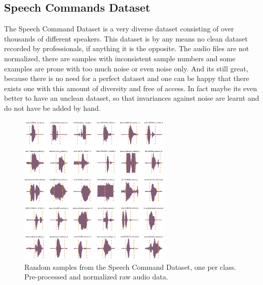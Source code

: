 
\subsection{Speech Commands Dataset}
The Speech Command Dataset \cite{warden2018} is a very diverse dataset consisting of over thousands of different speakers. This dataset is by any means no clean dataset recorded by professionals, if anything it is the opposite. 
The audio files are not normalized, there are samples with inconsistent sample numbers and some examples are prone with too much noise or even noise only.
And its still great, because there is no need for a perfect dataset and one can be happy that there exists one with this amount of diversity and free of access.
In fact maybe its even better to have an unclean dataset, so that invariances against noise are learnt and do not have be added by hand.

\begin{figure}[!ht]
  \centering
    \includegraphics[width=0.65\textwidth]{./4_practice/figs/a_dataset/wav_grid_c30}
  \caption{Random samples from the Speech Command Dataset, one per class. Pre-processed and normalized raw audio data.}
  \label{fig:wav_grid_c30}
\end{figure}
\FloatBarrier
\noindent